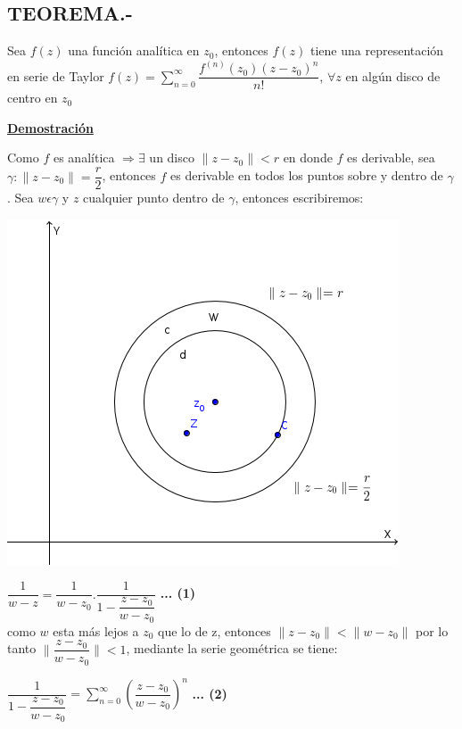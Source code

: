 \documentclass[10pt,a4paper]{article}
\begin{document}
\subsection{TEOREMA.-}
Sea $f(z)$ una función analítica en $z_0$, entonces $f(z)$ tiene una representación en serie de Taylor $\displaystyle{f(z) = \sum_{n=0}^{\infty}\dfrac{f^{(n)}(z_0)(z-z_0)^n}{n!}}$, $\displaystyle{\forall z}$ en algún disco de centro en $z_0$\\
\begin{center}
 \bf \underline{Demostración}
 \end{center} 
 Como $f$ es analítica $\Rightarrow \exists$ un disco $\parallel z- z_0\parallel < r$ en donde $f$ es derivable, sea $\displaystyle{\gamma : \parallel z- z_0\parallel= \dfrac{r}{2}}$, entonces $f$ es derivable en todos los puntos sobre y dentro de $\gamma$.
 Sea $w \epsilon \gamma$ y $z$ cualquier punto dentro de $\gamma$, entonces escribiremos:\\
\begin{center}
\includegraphics[scale=0.5]{3.png}
\end{center}
$\displaystyle{\dfrac{1}{w-z} = \dfrac{1}{w-z_0}. \dfrac{1}{1-\dfrac{z-z_0}{w-z_0}}}$ \textbf{... (1)}\\
como $w$ esta más lejos a $z_0$ que lo de z, entonces $\parallel  z - z_0\parallel < \parallel w - z_0 \parallel$ por lo tanto $\parallel \dfrac{z-z_0}{w-z_0} \parallel < 1$, mediante la serie geométrica se tiene:\\
\begin{center}
$\displaystyle{\dfrac{1}{1-\dfrac{z-z_0}{w-z_0}}= \sum_{n=0}^{\infty} (\dfrac{z - z_0}{w - z_0})^n}$ \textbf{... (2)}
\end{center}
\end{document}
